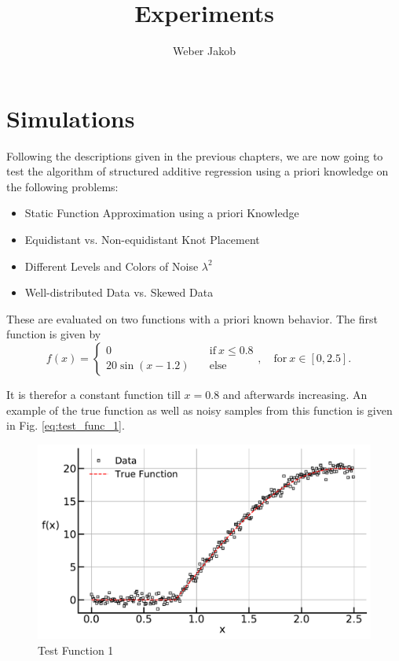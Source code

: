 \documentclass[10pt,a4paper]{article}
\title{Experiments}
\author{Weber Jakob}
\begin{document}
	\maketitle
	
\section{Simulations}

Following the descriptions given in the previous chapters, we are now going to test the algorithm of structured additive regression using a priori knowledge on the following problems:	

\begin{itemize}
	\item Static Function Approximation using a priori Knowledge
	\item Equidistant vs. Non-equidistant Knot Placement
	\item Different Levels and Colors of Noise $\lambda^2$
	\item Well-distributed Data vs. Skewed Data
\end{itemize}

These are evaluated on two functions with a priori known behavior. The first function is given by
\begin{equation} \label{eq:test_func_1}
	f(x) = \begin{cases}
			 0 \quad &\text{if} \ x \le 0.8 \\ 
			 20\sin (x-1.2) \quad &\text{else}  
		  \end{cases}, \quad \text{for} \ x \in [0,2.5]. \quad 
\end{equation}
	
It is therefor a constant function till $x=0.8$ and afterwards increasing. An example of the true function as well as noisy samples from this function is given in Fig. \ref{eq:test_func_1}.

\begin{figure}[H]
	\centering
	\includegraphics[width=\columnwidth]{../thesisplots/exp_inc1.pdf}
	\caption{Test Function 1}
	\label{fig:test_func_1}
\end{figure}
\end{document}
